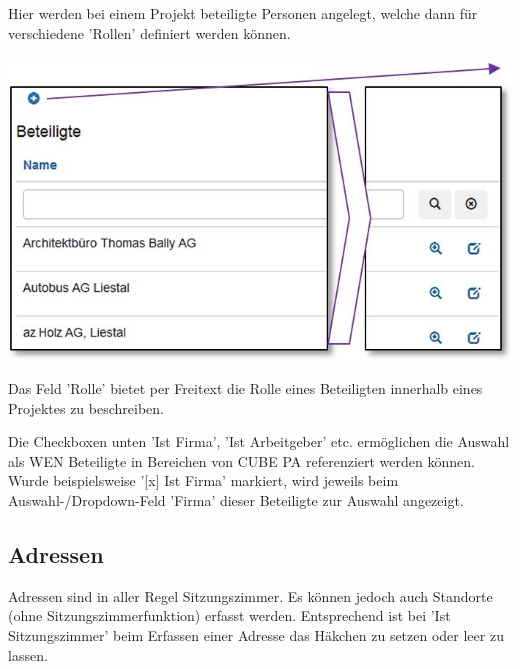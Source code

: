 Hier werden bei einem Projekt beteiligte Personen angelegt, welche dann für verschiedene 'Rollen' definiert werden können.

\begin{center}
\hspace{-15pt}   
\includegraphics[width=.9\linewidth]{../chapters/13_Konfigurationen/pictures/13-4_Beteiligte.jpg}
\end{center}

Das Feld 'Rolle' bietet per Freitext die Rolle eines Beteiligten innerhalb eines Projektes zu beschreiben. 

\vspace{\baselineskip}

Die Checkboxen unten 'Ist Firma', 'Ist Arbeitgeber' etc. ermöglichen die Auswahl als WEN Beteiligte in Bereichen von CUBE PA referenziert werden können. Wurde beispielsweise '[x] Ist Firma' markiert, wird jeweils beim Auswahl-/Dropdown-Feld 'Firma' dieser Beteiligte zur Auswahl angezeigt.

\vspace{\baselineskip}
\vspace{\baselineskip}
\vspace{\baselineskip}

\subsection{Adressen}

Adressen sind in aller Regel Sitzungszimmer. Es können jedoch auch Standorte (ohne Sitzungszimmerfunktion) erfasst werden. Entsprechend ist bei 'Ist Sitzungszimmer' beim Erfassen einer Adresse das Häkchen zu setzen oder leer zu lassen.

